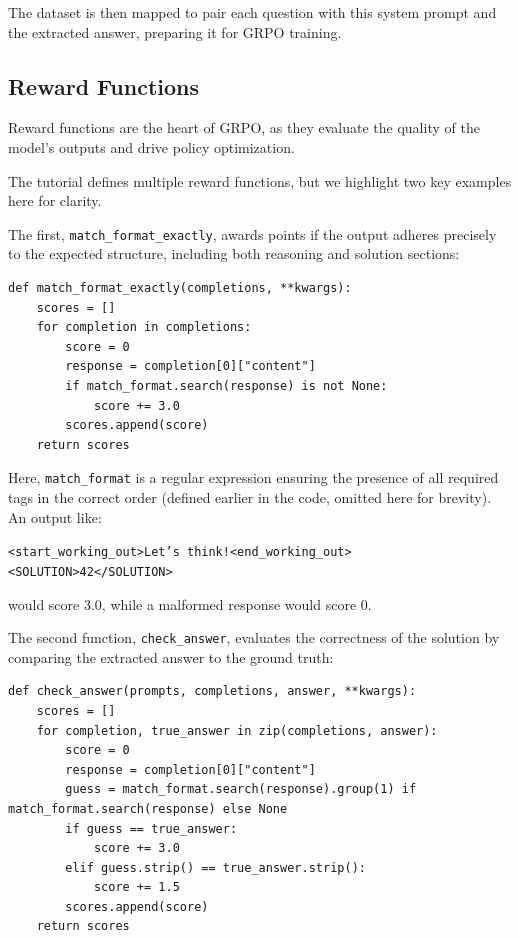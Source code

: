 \documentclass{article}
\begin{document}
The dataset is then mapped to pair each question with this system prompt and the extracted answer, preparing it for GRPO training.

\subsection*{Reward Functions}

Reward functions are the heart of GRPO, as they evaluate the quality of the model’s outputs and drive policy optimization. 

\vspace{0.5em}
The tutorial defines multiple reward functions, but we highlight two key examples here for clarity.

\vspace{0.5em}
The first, \texttt{match\_format\_exactly}, awards points if the output adheres precisely to the expected structure, including both reasoning and solution sections:

\begin{verbatim}
def match_format_exactly(completions, **kwargs):
    scores = []
    for completion in completions:
        score = 0
        response = completion[0]["content"]
        if match_format.search(response) is not None:
            score += 3.0
        scores.append(score)
    return scores
\end{verbatim}

Here, \texttt{match\_format} is a regular expression ensuring the presence of all required tags in the correct order (defined earlier in the code, omitted here for brevity). An output like:

\begin{center}
  \texttt{<start\_working\_out>Let’s think!<end\_working\_out><SOLUTION>42</SOLUTION>}
\end{center}

would score 3.0, while a malformed response would score 0.

\vspace{0.5em}
The second function, \texttt{check\_answer}, evaluates the correctness of the solution by comparing the extracted answer to the ground truth:

\begin{verbatim}
def check_answer(prompts, completions, answer, **kwargs):
    scores = []
    for completion, true_answer in zip(completions, answer):
        score = 0
        response = completion[0]["content"]
        guess = match_format.search(response).group(1) if match_format.search(response) else None
        if guess == true_answer:
            score += 3.0
        elif guess.strip() == true_answer.strip():
            score += 1.5
        scores.append(score)
    return scores
\end{verbatim}
\end{document}
